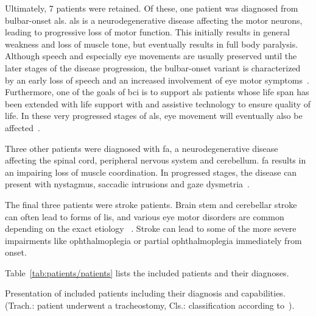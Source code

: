 Ultimately, 7 patients were retained.
Of these, one patient was diagnosed from bulbar-onset \ac{als}.
\ac{als} is a neurodegenerative disease affecting the motor neurons, leading to
progressive loss of motor function.
This initially results in general weakness and loss of muscle tone, but
eventually results in full body paralysis.
Although speech and especially eye movements are usually preserved until the
later stages of the disease progression, the bulbar-onset variant is
characterized by an early loss of speech and an increased involvement of eye
motor symptoms~\cite{Guo2022}.
Furthermore, one of the goals of \ac{bci} is to support \ac{als} patients whose
life span has been extended with life support with and assistive technology to
ensure quality of life.
In these very progressed stages of \ac{als}, eye movement will eventually also
be affected~\cite{Hayashi1991}.

Three other patients were diagnosed with \ac{fa}, a neurodegenerative
disease affecting the
spinal cord, peripheral nervous system and cerebellum.
\ac{fa} results in an impairing loss of muscle coordination.
In progressed stages, the disease can present with nystagmus, saccadic
intrusions and gaze dysmetria~\cite{Cook2017}.

The final three patients were stroke patients.
Brain stem and cerebellar stroke can often lead to forms of \ac{lis}, and
various eye motor disorders are common depending on the exact etiology
~\cite{Bogousslavsky1987, Moncayo2009}.
Stroke can lead to some of the more severe impairments like ophthalmoplegia or
partial ophthalmoplegia immediately from onset.

Table~\ref{tab:patients/patients} lists the included patients and their
diagnoses.


\begin{table}[t]
  \centering
  \footnotesize
  
  \caption[Presentation of included patients including their diagnosis and
  capabilities.]{Presentation of included patients including their diagnosis and
  capabilities.
  (Trach.: patient underwent a tracheostomy, Cls.: classification according
  to~\textcite{Wolpaw2006}).
  }
  \label{tab:patients/patients}
\end{table}

